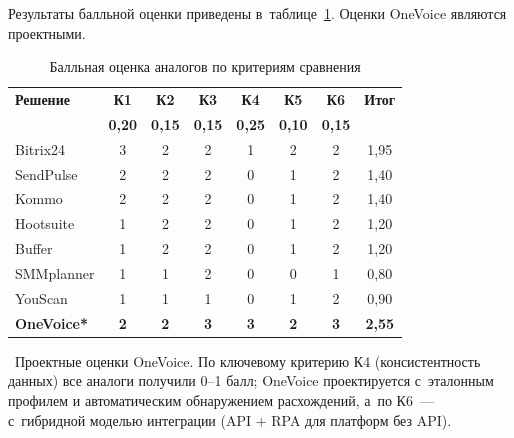 Результаты балльной оценки приведены в~таблице~\ref{tab:analogues}. Оценки OneVoice являются проектными.

\begin{table}[H]
  \caption{Балльная оценка аналогов по критериям сравнения}
  \label{tab:analogues}
  \small
  \begin{tabularx}{\textwidth}{|X|c|c|c|c|c|c|c|}
    \hline
    \textbf{Решение} & \textbf{К1} & \textbf{К2} & \textbf{К3} & \textbf{К4} & \textbf{К5} & \textbf{К6} & \textbf{Итог} \\
    \textbf{} & \textbf{0{,}20} & \textbf{0{,}15} & \textbf{0{,}15} & \textbf{0{,}25} & \textbf{0{,}10} & \textbf{0{,}15} & \\
    \hline
    Bitrix24 & 3 & 2 & 2 & 1 & 2 & 2 & 1{,}95 \\
    \hline
    SendPulse & 2 & 2 & 2 & 0 & 1 & 2 & 1{,}40 \\
    \hline
    Kommo & 2 & 2 & 2 & 0 & 1 & 2 & 1{,}40 \\
    \hline
    Hootsuite & 1 & 2 & 2 & 0 & 1 & 2 & 1{,}20 \\
    \hline
    Buffer & 1 & 2 & 2 & 0 & 1 & 2 & 1{,}20 \\
    \hline
    SMMplanner & 1 & 1 & 2 & 0 & 0 & 1 & 0{,}80 \\
    \hline
    YouScan & 1 & 1 & 1 & 0 & 1 & 2 & 0{,}90 \\
    \hline
    \textbf{OneVoice*} & \textbf{2} & \textbf{2} & \textbf{3} & \textbf{3} & \textbf{2} & \textbf{3} & \textbf{2{,}55} \\
    \hline
  \end{tabularx}
\end{table}

\noindent *~Проектные оценки OneVoice. По ключевому критерию К4 (консистентность данных) все аналоги получили 0--1 балл; OneVoice проектируется с~эталонным профилем и автоматическим обнаружением расхождений, а~по К6~--- с~гибридной моделью интеграции (API + RPA для платформ без API).
